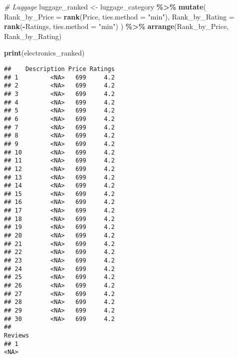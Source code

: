 \documentclass[
]{article}
\newenvironment{Shaded}{\begin{snugshade}}{\end{snugshade}}
\newcommand{\AttributeTok}[1]{\textcolor[rgb]{0.13,0.29,0.53}{#1}}
\newcommand{\CommentTok}[1]{\textcolor[rgb]{0.56,0.35,0.01}{\textit{#1}}}
\newcommand{\FunctionTok}[1]{\textcolor[rgb]{0.13,0.29,0.53}{\textbf{#1}}}
\newcommand{\NormalTok}[1]{#1}
\newcommand{\OtherTok}[1]{\textcolor[rgb]{0.56,0.35,0.01}{#1}}
\newcommand{\SpecialCharTok}[1]{\textcolor[rgb]{0.81,0.36,0.00}{\textbf{#1}}}
\newcommand{\StringTok}[1]{\textcolor[rgb]{0.31,0.60,0.02}{#1}}
\begin{document}
\begin{Shaded}
\begin{Highlighting}[]
\CommentTok{\# Luggage}
\NormalTok{luggage\_ranked }\OtherTok{\textless{}{-}}\NormalTok{ luggage\_category }\SpecialCharTok{\%\textgreater{}\%}
  \FunctionTok{mutate}\NormalTok{(}
    \AttributeTok{Rank\_by\_Price =} \FunctionTok{rank}\NormalTok{(Price, }\AttributeTok{ties.method =} \StringTok{"min"}\NormalTok{),}
    \AttributeTok{Rank\_by\_Rating =} \FunctionTok{rank}\NormalTok{(}\SpecialCharTok{{-}}\NormalTok{Ratings, }\AttributeTok{ties.method =} \StringTok{"min"}\NormalTok{)}
\NormalTok{  ) }\SpecialCharTok{\%\textgreater{}\%}
  \FunctionTok{arrange}\NormalTok{(Rank\_by\_Price, Rank\_by\_Rating)}

\FunctionTok{print}\NormalTok{(electronics\_ranked)}
\end{Highlighting}
\end{Shaded}

\begin{verbatim}
##    Description Price Ratings
## 1         <NA>   699     4.2
## 2         <NA>   699     4.2
## 3         <NA>   699     4.2
## 4         <NA>   699     4.2
## 5         <NA>   699     4.2
## 6         <NA>   699     4.2
## 7         <NA>   699     4.2
## 8         <NA>   699     4.2
## 9         <NA>   699     4.2
## 10        <NA>   699     4.2
## 11        <NA>   699     4.2
## 12        <NA>   699     4.2
## 13        <NA>   699     4.2
## 14        <NA>   699     4.2
## 15        <NA>   699     4.2
## 16        <NA>   699     4.2
## 17        <NA>   699     4.2
## 18        <NA>   699     4.2
## 19        <NA>   699     4.2
## 20        <NA>   699     4.2
## 21        <NA>   699     4.2
## 22        <NA>   699     4.2
## 23        <NA>   699     4.2
## 24        <NA>   699     4.2
## 25        <NA>   699     4.2
## 26        <NA>   699     4.2
## 27        <NA>   699     4.2
## 28        <NA>   699     4.2
## 29        <NA>   699     4.2
## 30        <NA>   699     4.2
##                                                                                                                                                                                                                                                                                                                                                                                                                                                                                   Reviews
## 1                                                                                                                                                                                                                                                                                                                                                                                                                                                                                    <NA>

\end{verbatim}
\end{document}
